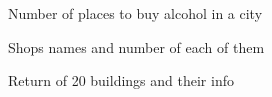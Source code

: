 \documentclass[14pt]{extreport}
\begin{document}
Number of places to buy alcohol in a city
\begin{center}
  \end{center}
\centering

\newpage

Shops names and number of each of them
\newline
\begin{center}
  \end{center}
\centering 

\newpage

Return of 20 buildings and their info
\newline
\begin{center}
  \end{center}
\centering 
\end{document}
